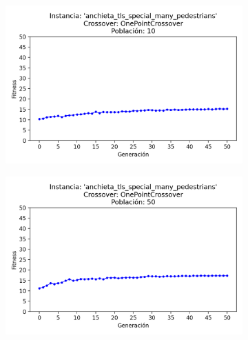 \begin{figure}[h]
    \centering
    \begin{subfigure}[t]{.49\textwidth}
      \centering
      \includegraphics[width=\textwidth]{report/images/estudio/anchieta_tls_special_many_pedestrians-OnePointCrossover-10.png}
    \end{subfigure}
    \hfill
    \begin{subfigure}[t]{.49\textwidth}
      \centering
      \includegraphics[width=\textwidth]{report/images/estudio/anchieta_tls_special_many_pedestrians-OnePointCrossover-50.png}
    \end{subfigure}
    \vspace{0.7cm}
    \begin{subfigure}[t]{.49\textwidth}
      \centering

\end{subfigure}
\end{figure}

